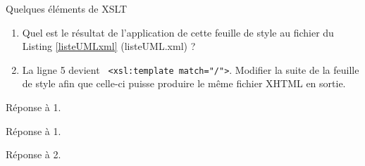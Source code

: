 \begin{frame}{Quelques \'el\'ements de XSLT}
\begin{exoblock}
\begin{enumerate}
\item Quel est le r\'esultat de l'application de cette feuille de style au fichier du Listing \ref{listeUMLxml} (listeUML.xml) ? 
\item La ligne 5 devient \verb? <xsl:template match="/">?.  Modifier la suite de la feuille de style afin que celle-ci puisse produire le m\^eme fichier XHTML en sortie.
\end{enumerate} 
\end{exoblock}

\framebreak

R\'eponse à 1.\\

\begin{center}
\begin{minipage}{0.9\textwidth}

\end{minipage}
\end{center}


\framebreak

R\'eponse à 1.\\


\framebreak

R\'eponse à 2.\\

\begin{center}
\begin{minipage}{0.9\textwidth}

\end{minipage}
\end{center}


\end{frame}
